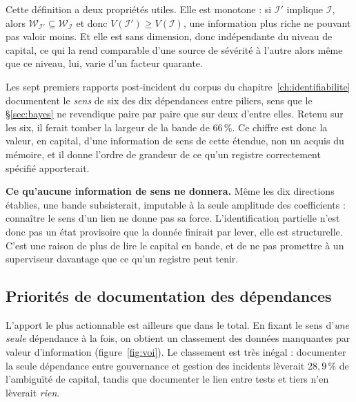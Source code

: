 Cette définition a deux propriétés utiles. Elle est monotone : si
$\mathcal{I}'$ implique $\mathcal{I}$, alors $\mathcal{W}_{\mathcal{I}'}\subseteq
\mathcal{W}_{\mathcal{I}}$ et donc $V(\mathcal{I}')\ge V(\mathcal{I})$, une information plus
riche ne pouvant pas valoir moins. Et elle est sans dimension, donc indépendante du
niveau de capital, ce qui la rend comparable d'une source de sévérité à l'autre alors même que
ce niveau, lui, varie d'un facteur quarante.

Les sept premiers rapports post-incident du corpus du chapitre~\ref{ch:identifiabilite} documentent le
\emph{sens} de six des dix dépendances entre piliers, sens que le \S\ref{sec:bayes} ne revendique
paire par paire que sur deux d'entre elles. Retenu sur les six, il ferait tomber la largeur de la
bande de $66\,\%$. Ce chiffre est donc la valeur, en capital, d'une information de sens de cette
étendue, non un acquis du mémoire, et il donne l'ordre de grandeur de ce qu'un registre
correctement spécifié apporterait.

\begin{attention}
\textbf{Ce qu'aucune information de sens ne donnera.} Même les dix directions établies, une bande
subsisterait, imputable à la seule amplitude des coefficients : connaître le sens d'un
lien ne donne pas sa force. L'identification partielle n'est donc pas un état provisoire que la
donnée finirait par lever, elle est structurelle. C'est une raison de plus de lire le
capital en bande, et de ne pas promettre à un superviseur davantage que ce qu'un registre peut
tenir.
\end{attention}



\subsection{Priorités de documentation des dépendances}

L'apport le plus actionnable est ailleurs que dans le total. En fixant le sens d'\emph{une seule}
dépendance à la fois, on obtient un classement des données manquantes par valeur
d'information (figure~\ref{fig:voi}). Le classement est très inégal : documenter la seule dépendance
entre gouvernance et gestion des incidents lèverait $28{,}9\,\%$ de
l'ambiguïté de capital, tandis que documenter le lien entre tests et tiers n'en lèverait
\emph{rien}.


